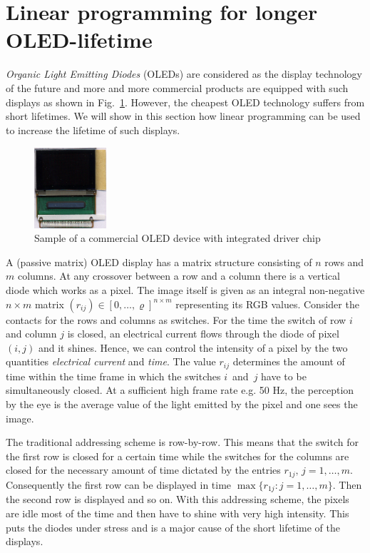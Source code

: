 \section{Linear programming for longer OLED-lifetime}



\emph{Organic Light Emitting Diodes} (OLEDs) are considered as the
display technology of the future and  more and more commercial
products are equipped 
with such displays as shown in Fig.~\ref{fig:displayandchip}. However,
the cheapest OLED technology suffers from short lifetimes.
 We will
show in this section how linear programming can be used to increase
the lifetime of such displays. 

\begin{figure}[ht]
  \centering \includegraphics[height=3cm]{figures/displayandchip.eps}
 \caption{Sample of a commercial OLED device with integrated driver chip}
 \label{fig:displayandchip}
\end{figure}



A (passive matrix) OLED display has a matrix structure consisting of $n$ rows
and $m$ columns.  At any crossover between a row and a column there is
a vertical diode which works as a pixel. 
The image itself is given as an integral non-negative $n \times m$ matrix
$(r_{ij}) \in [0,\ldots,\varrho]^{n \times m}$ representing its RGB values.
Consider the contacts for the rows and columns as switches.  For the
time the switch of row $i$ and column $j$ is closed, an electrical
current flows through the diode of pixel $(i,j)$ and it shines. Hence,
we can control the intensity of a pixel by the two quantities
\emph{electrical current} and \emph{time}. 
The value $r_{ij}$ determines the amount of time within the time frame
in which the switches $i$~and~$j$ have to be simultaneously closed.
At a sufficient high frame rate e.g. 50 Hz, the perception by the eye
is the average value of the light emitted by the pixel and one sees the image.

The traditional addressing scheme is row-by-row. This means that the
switch for the first row is closed for a certain time while the
switches for the columns are closed for the necessary amount of time
dictated by the entries $r_{1j},\, j=1,\ldots,m$. Consequently the first
row can be displayed in time $\max \{ r_{1j}: j = 1, \ldots, m \}$.
Then the second row is displayed and so on. With this addressing
scheme, the pixels are idle most of the time and then have to shine
with very high intensity. This puts the diodes under stress and is a
major cause of the short lifetime of the displays. 


